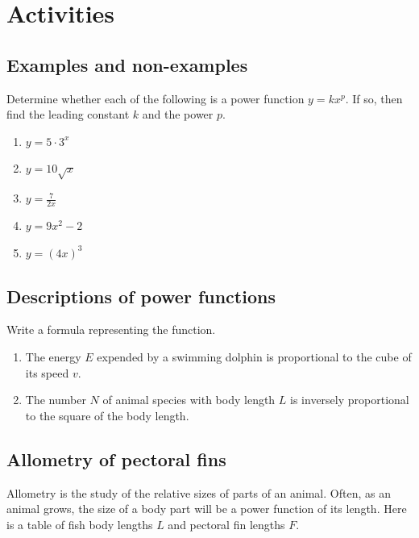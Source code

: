 \documentclass[
]{book}
\providecommand{\tightlist}{%
  \setlength{\itemsep}{0pt}\setlength{\parskip}{0pt}}
\begin{document}
\hypertarget{activities-4}{%
\section{Activities}\label{activities-4}}

\hypertarget{examples-and-non-examples}{%
\subsection{Examples and non-examples}\label{examples-and-non-examples}}

Determine whether each of the following is a power function \(y=k x^p\). If so, then find the leading constant \(k\) and the power \(p\).

\begin{enumerate}
\def\labelenumi{\arabic{enumi}.}
\tightlist
\item
  \(y=5 \cdot 3^x\)
\item
  \(y = 10 \sqrt{x}\)
\item
  \(\displaystyle{y = \frac{7}{2x}}\)
\item
  \(y = 9x^2 -2\)
\item
  \(y = (4x)^3\)
\end{enumerate}

\hypertarget{descriptions-of-power-functions}{%
\subsection{Descriptions of power functions}\label{descriptions-of-power-functions}}

Write a formula representing the function.

\begin{enumerate}
\def\labelenumi{\arabic{enumi}.}
\tightlist
\item
  The energy \(E\) expended by a swimming dolphin is proportional to the cube of its speed \(v\).
\item
  The number \(N\) of animal species with body length \(L\) is inversely proportional to the square of the body length.
\end{enumerate}

\hypertarget{allometry-of-pectoral-fins}{%
\subsection{Allometry of pectoral fins}\label{allometry-of-pectoral-fins}}

Allometry is the study of the relative sizes of parts of an animal. Often, as an animal grows, the size of a body part will be a power function of its length. Here is a table of fish body lengths \(L\) and pectoral fin lengths \(F\).
\end{document}
